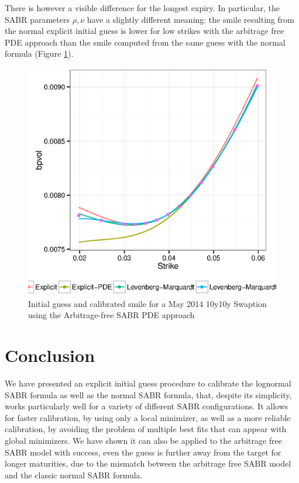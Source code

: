\documentclass[]{rAMF2e}
\begin{document}
There is however a visible difference for the longest expiry. In particular, the SABR parameters $\rho, \nu$ have a slightly different meaning: the smile resulting from the normal explicit initial guess is lower for low strikes with the arbitrage free PDE approach than the smile computed from the same guess with the normal formula (Figure \ref{fig:normal_vs_arbfree_fit_10y10y}).

\begin{figure}[htbp]
  \caption{\label{fig:normal_vs_arbfree_fit_10y10y}Initial guess and calibrated smile for a May 2014 10y10y Swaption using the Arbitrage-free SABR PDE approach }
\begin{center}
 \includegraphics[width=12cm]{normal_vs_arbfree_fit_10y10y.eps}
\end{center}
\end{figure}

\section{Conclusion}
We have presented an explicit initial guess procedure to calibrate the lognormal SABR formula as well as the normal SABR formula, that, despite its simplicity, works particularly well for a variety of different SABR configurations. It allows for faster calibration, by using only a local minimizer, as well as a more reliable calibration, by avoiding the problem of multiple best fits that can appear with global minimizers. 
We have shown it can also be applied to the arbitrage free SABR model with success, even the guess is further away from the target for longer maturities, due to the mismatch between the arbitrage free SABR model and the classic normal SABR formula.

\newpage

%

\end{document}
